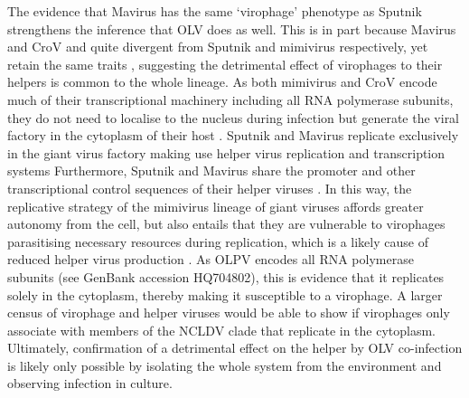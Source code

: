 The evidence that Mavirus has the same `virophage' phenotype as Sputnik strengthens the inference that \ac{OLV} does as well.
This is in part because Mavirus and \ac{CroV} and quite divergent from Sputnik and mimivirus respectively, yet retain the same traits \cite{Fischer2010, Fischer2011a}, suggesting the detrimental effect of virophages to their helpers is common to the whole lineage.
As both mimivirus and \ac{CroV} encode much of their transcriptional machinery including all \textsc{RNA} polymerase subunits, they do not need to localise to the nucleus during infection but generate the viral factory in the cytoplasm of their host \cite{LaScola2008, Fischer2011a}.
Sputnik and Mavirus replicate exclusively in the giant virus factory making use helper virus replication and transcription systems \cite{LaScola2008, Fischer2011a}
Furthermore, Sputnik and Mavirus share the promoter and other transcriptional control sequences of their helper viruses \cite{Claverie2009, Fischer2011a}.
In this way, the replicative strategy of the mimivirus lineage of giant viruses affords greater autonomy from the cell, but also entails that they are vulnerable to virophages parasitising necessary resources during replication, which is a likely cause of reduced helper virus production \cite{Claverie2009, Fischer2011a, Fischer2011b}.
As \ac{OLPV} encodes all \textsc{RNA} polymerase subunits (see GenBank accession HQ704802), this is evidence that it replicates solely in the cytoplasm, thereby making it susceptible to a virophage.
A larger census of virophage and helper viruses would be able to show if virophages only associate with members of the \ac{NCLDV} clade that replicate in the cytoplasm.
Ultimately, confirmation of a detrimental effect on the helper by \ac{OLV} co-infection is likely only possible by isolating the whole system from the environment and observing infection in culture.

